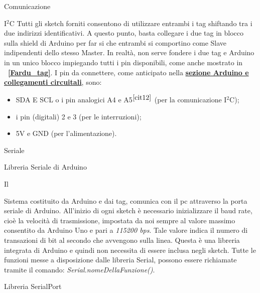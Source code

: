 \documentclass[12pt]{report}
\begin{document}
\begin{section}{Comunicazione}
\begin{subsection}{I$^{2}$C}
			Tutti gli sketch forniti consentono di utilizzare entrambi i tag shiftando tra i due indirizzi identificativi.
			A questo punto, basta collegare i due tag in blocco sulla shield di Arduino per far si che entrambi si comportino come Slave indipendenti dello stesso Master. 
			In realtà, non serve fondere i due tag e Arduino in un unico blocco impiegando tutti i pin disponibili, come anche mostrato in \textbf{\figurename~\ref{Fardu_tag}}. I pin da connettere, come anticipato nella \hyperlink{S1}{\textbf{sezione Arduino e collegamenti circuitali}}, sono: 
		
			\begin{itemize}
				\item SDA E SCL o i pin analogici A4 e A5$^{{\cite{cit12}}}$ (per la comunicazione I$^2$C);
				\item i pin (digitali) 2 e 3 (per le interruzioni);
				\item 5V e GND (per l'alimentazione).
			\end{itemize}

		\end{subsection}
	
		\begin{subsection}{Seriale}
	
		\begin{subsubsection}{Libreria Seriale di Arduino}

			\hypertarget{SS2}{Il} Sistema costituito da Arduino e dai tag, comunica con il pc attraverso la porta seriale di Arduino.  All’inizio di ogni sketch è necessario inizializzare il baud rate, cioè la velocità di trasmissione, impostata da noi sempre al valore massimo consentito da Arduino Uno e pari a \textit{115200 						bps}. Tale valore indica il numero di transazioni di bit al secondo che avvengono sulla linea. Questa è una libreria integrata di Arduino e quindi non necessita di essere inclusa negli sketch.
			Tutte le funzioni messe a disposizione dalle libreria Serial, possono essere richiamate tramite il comando: \textit{Serial.nomeDellaFunzione()}.

		 \end{subsubsection}

		 \begin{subsubsection}{Libreria SerialPort}


\end{subsubsection}
\end{subsection}
\end{section}
\end{document}
